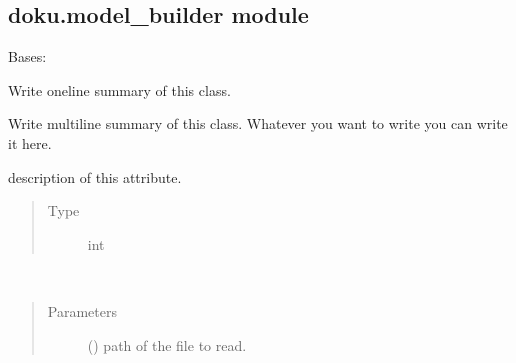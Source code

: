 \documentclass[letterpaper,10pt,english]{sphinxmanual}
\begin{document}
\subsection{doku.model\_builder module}
\label{\detokenize{doku:module-doku.model_builder}}\label{\detokenize{doku:doku-model-builder-module}}

\begin{fulllineitems}
\label{\detokenize{doku:doku.model_builder.BaseModelBuilder}}
\sphinxAtStartPar
Bases: 

\sphinxAtStartPar
Write one\sphinxhyphen{}line summary of this class.

\sphinxAtStartPar
Write multi\sphinxhyphen{}line summary of this class. Whatever you want to write you
can write it here.

\begin{fulllineitems}
\label{\detokenize{doku:doku.model_builder.BaseModelBuilder.att_a}}
\sphinxAtStartPar
description of this attribute.
\begin{quote}\begin{description}
\item[{Type}] \leavevmode
\sphinxAtStartPar
int

\end{description}\end{quote}

\end{fulllineitems}


\begin{fulllineitems}
\label{\detokenize{doku:doku.model_builder.BaseModelBuilder.method_a}}~\begin{quote}\begin{description}
\item[{Parameters}] \leavevmode
\sphinxAtStartPar
{} () \textendash{} path of the file to read.

\end{description}\end{quote}

\end{fulllineitems}


\end{fulllineitems}
\end{document}

